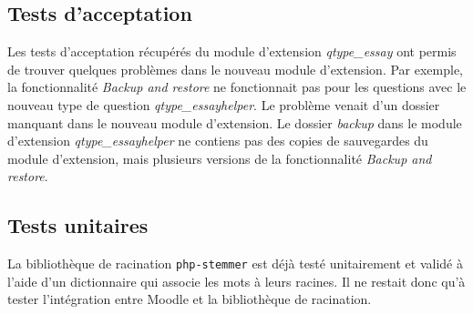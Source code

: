 \subsection{Tests d'acceptation} \label{dev_test_acceptation}
Les tests d'acceptation r\'ecup\'er\'es du module d'extension \textit{qtype\_essay} ont permis de trouver quelques probl\`emes  dans le nouveau module d'extension.
Par exemple, la fonctionnalit\'e \textit{Backup and restore} ne fonctionnait pas pour les questions avec le nouveau type de question \textit{qtype\_essayhelper}.
Le probl\`eme venait d'un dossier manquant dans le nouveau module d'extension.
Le dossier \textit{backup} dans le module d'extension \textit{qtype\_essayhelper} ne contiens pas des copies de sauvegardes du module d'extension, mais plusieurs versions de la fonctionnalit\'e \textit{Backup and restore}.
\subsection{Tests unitaires} \label{dev_test_unitaire}
La biblioth\`eque de racination \texttt{php-stemmer} est d\'ej\`a test\'e unitairement et valid\'e \`a l'aide d'un dictionnaire qui associe les mots \`a leurs racines.
Il ne restait donc qu'\`a tester l'int\'egration entre Moodle et la biblioth\`eque de racination.
